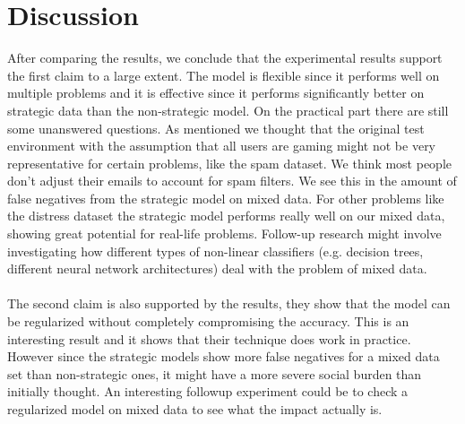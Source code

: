 \section{Discussion}
After comparing the results, we conclude that the experimental results support the first claim to a large extent. The model is flexible since it performs well on multiple problems and it is effective since it performs significantly better on strategic data than the non-strategic model. On the practical part there are still some unanswered questions. As mentioned we thought that the original test environment with the assumption that all users are gaming might not be very representative for certain problems, like the spam dataset. We think most people don't adjust their emails to account for spam filters. We see this in the amount of false negatives from the strategic model on mixed data. For other problems like the distress dataset the strategic model performs really well on our mixed data, showing great potential for real-life problems. Follow-up research might involve investigating how different types of non-linear classifiers (e.g. decision trees, different neural network architectures) deal with the problem of mixed data.\\
\\
The second claim is also supported by the results, they show that the model can be regularized without completely compromising the accuracy. This is an interesting result and it shows that their technique does work in practice. However since the strategic models show more false negatives for a mixed data set than non-strategic ones, it might have a more severe social burden than initially thought. An interesting followup experiment could be to check a regularized model on mixed data to see what the impact actually is.

